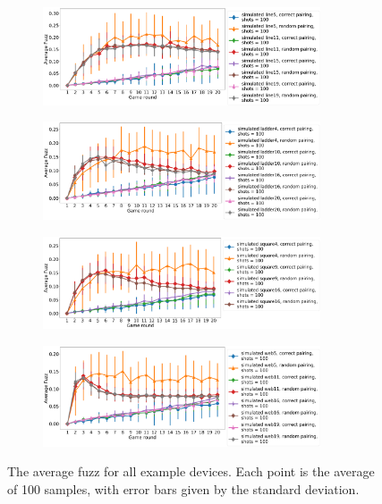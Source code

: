 \documentclass[aps,prl,twocolumn,showpacs,preprintnumbers]{revtex4-1}
\begin{document}
\begin{figure}
    \centering
    \begin{subfigure}[b]{\textwidth}
        \includegraphics[width=0.9\textwidth]{figures/line_fuzz.png}
    \end{subfigure}
    \begin{subfigure}[b]{\textwidth}
        \includegraphics[width=0.9\textwidth]{figures/ladder_fuzz.png}
    \end{subfigure}
    \begin{subfigure}[b]{\textwidth}
        \includegraphics[width=0.9\textwidth]{figures/square_fuzz.png}
    \end{subfigure}
    \begin{subfigure}[b]{\textwidth}
        \includegraphics[width=0.9\textwidth]{figures/web_fuzz.png}
    \end{subfigure}
    \caption{The average fuzz for all example devices. Each point is the average of 100 samples, with error bars given by the standard deviation.}\label{fig:example_fuzz}
\end{figure}
\end{document}
